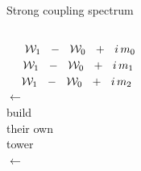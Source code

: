 \documentclass{beamer}
\begin{document}
\begin{frame}{Strong coupling spectrum}

\begin{columns}[t]
\column{10cm}
$
	\hspace{5.5mm}
	\mathcal{W}_1  ~~-~~  \mathcal{W}_0  ~~+~~  i\,m_0
$
	\\[12mm]

$
	\hspace{5mm}
	\mathcal{W}_1  ~~-~~  \mathcal{W}_0  ~~+~~  i\,m_1
$
	\\[12mm]

$
	\hspace{4.6mm}
	\mathcal{W}_1  ~~-~~  \mathcal{W}_0  ~~+~~  i\,m_2
$
	\\[8mm]

\column{2cm}
\centering
\small
{}
{
	$ \longleftarrow $\\[-0.8mm]
	build\\
	their own\\
	tower\\[-0.8mm]
	$ \longleftarrow $\\
}

\end{columns}


\end{frame}
\end{document}
